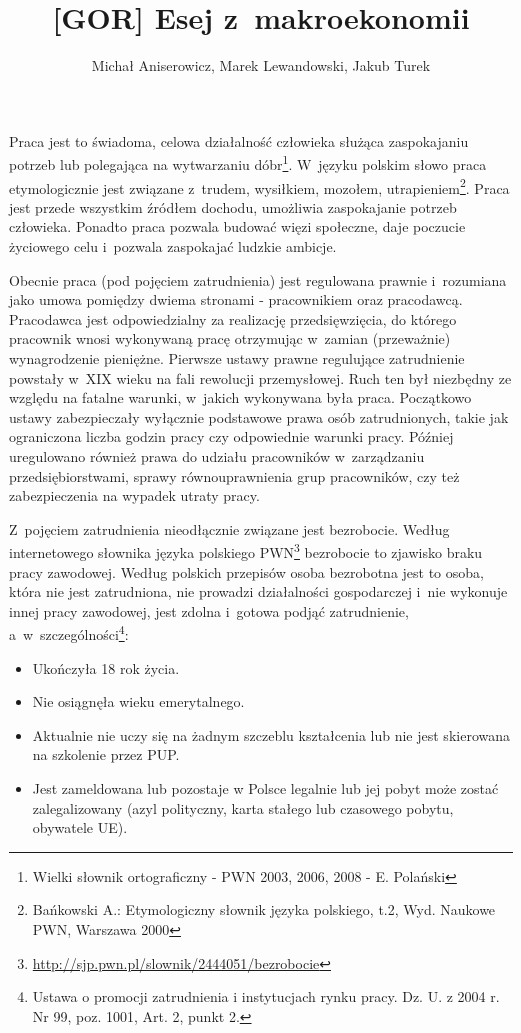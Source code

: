 \documentclass[12pt]{article}
\title{[GOR] Esej z~makroekonomii}
\author{Michał Aniserowicz, Marek Lewandowski, Jakub Turek}
\date{}
\begin{document}
    \maketitle
    
    Praca jest to świadoma, celowa działalność człowieka służąca zaspokajaniu potrzeb lub polegająca na wytwarzaniu dóbr\footnote{Wielki słownik ortograficzny - PWN 2003, 2006, 2008 - E. Polański}. W~języku polskim słowo praca etymologicznie jest związane z~trudem, wysiłkiem, mozołem, utrapieniem\footnote{Bańkowski A.: Etymologiczny słownik języka polskiego, t.2, Wyd. Naukowe PWN, Warszawa 2000}. Praca jest przede wszystkim źródłem dochodu, umożliwia zaspokajanie potrzeb człowieka. Ponadto praca pozwala budować więzi społeczne, daje poczucie życiowego celu i~pozwala zaspokajać ludzkie ambicje. 
    
    Obecnie praca (pod pojęciem zatrudnienia) jest regulowana prawnie i~rozumiana jako umowa pomiędzy dwiema stronami - pracownikiem oraz pracodawcą. Pracodawca jest odpowiedzialny za realizację przedsięwzięcia, do którego pracownik wnosi wykonywaną pracę otrzymując w~zamian (przeważnie) wynagrodzenie pieniężne. Pierwsze ustawy prawne regulujące zatrudnienie powstały w~XIX wieku na fali rewolucji przemysłowej. Ruch ten był niezbędny ze względu na fatalne warunki, w~jakich wykonywana była praca. Początkowo ustawy zabezpieczały wyłącznie podstawowe prawa osób zatrudnionych, takie jak ograniczona liczba godzin pracy czy odpowiednie warunki pracy. Później uregulowano również prawa do udziału pracowników w~zarządzaniu przedsiębiorstwami, sprawy równouprawnienia grup pracowników, czy też zabezpieczenia na wypadek utraty pracy.
    
    Z~pojęciem zatrudnienia nieodłącznie związane jest bezrobocie. Według internetowego słownika języka polskiego PWN\footnote{\url{http://sjp.pwn.pl/slownik/2444051/bezrobocie}} bezrobocie to zjawisko braku pracy zawodowej. Według polskich przepisów osoba bezrobotna jest to osoba, która nie jest zatrudniona, nie prowadzi działalności gospodarczej i~nie wykonuje innej pracy zawodowej, jest zdolna i~gotowa podjąć zatrudnienie, a~w~szczególności\footnote{Ustawa o promocji zatrudnienia i instytucjach rynku pracy. Dz. U. z 2004 r. Nr 99, poz. 1001, Art. 2, punkt 2.}:
    
    \begin{itemize}
        \item Ukończyła 18 rok życia.
        \item Nie osiągnęła wieku emerytalnego.
        \item Aktualnie nie uczy się na żadnym szczeblu kształcenia lub nie jest skierowana na szkolenie przez PUP.
        \item Jest zameldowana lub pozostaje w Polsce legalnie lub jej pobyt może zostać zalegalizowany (azyl polityczny, karta stałego lub czasowego pobytu, obywatele UE).
    \end{itemize}
    
\end{document}
